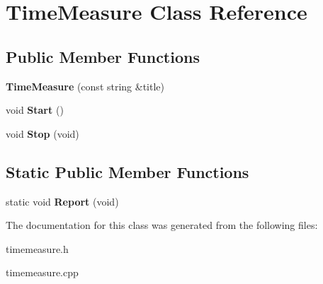 \hypertarget{classTimeMeasure}{\section{\-Time\-Measure \-Class \-Reference}
\label{classTimeMeasure}
}
\subsection*{\-Public \-Member \-Functions}
\begin{DoxyCompactItemize}
\item 
\hypertarget{classTimeMeasure_ada461c9f89dce4c52b6e30e7cf8b1750}{{\bfseries \-Time\-Measure} (const string \&title)}\label{classTimeMeasure_ada461c9f89dce4c52b6e30e7cf8b1750}

\item 
\hypertarget{classTimeMeasure_a73a09593f22bab5270cec7514a8c2771}{void {\bfseries \-Start} ()}\label{classTimeMeasure_a73a09593f22bab5270cec7514a8c2771}

\item 
\hypertarget{classTimeMeasure_a67706c32e985156d13918875cb71968d}{void {\bfseries \-Stop} (void)}\label{classTimeMeasure_a67706c32e985156d13918875cb71968d}

\end{DoxyCompactItemize}
\subsection*{\-Static \-Public \-Member \-Functions}
\begin{DoxyCompactItemize}
\item 
\hypertarget{classTimeMeasure_ab62bbe12d6a71b692560a2e076735dc6}{static void {\bfseries \-Report} (void)}\label{classTimeMeasure_ab62bbe12d6a71b692560a2e076735dc6}

\end{DoxyCompactItemize}


\-The documentation for this class was generated from the following files\-:\begin{DoxyCompactItemize}
\item 
timemeasure.\-h\item 
timemeasure.\-cpp\end{DoxyCompactItemize}
